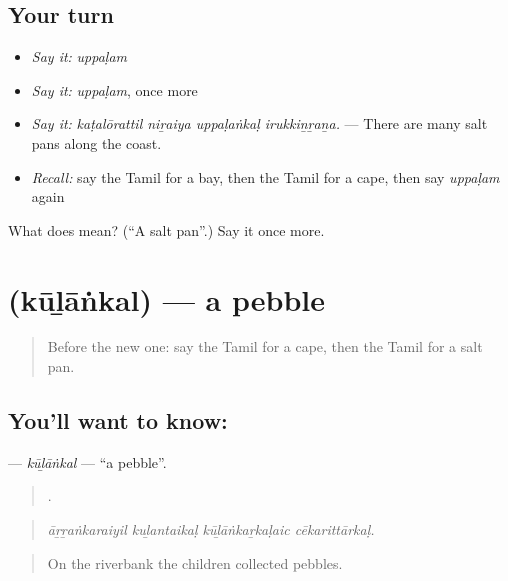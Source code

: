 \subsection*{Your turn}
\begin{itemize}
\raggedright
  \item \emph{Say it:} \emph{uppaḷam}
  \item \emph{Say it:} \emph{uppaḷam}, once more
  \item \emph{Say it:} \emph{kaṭalōrattil niṟaiya uppaḷaṅkaḷ irukkiṉṟaṉa.} — There are many salt pans along the coast.
  \item \emph{Recall:} say the Tamil for a bay, then the Tamil for a cape, then say \emph{uppaḷam} again
\end{itemize}

\begin{tcolorbox}[breakable,colback=teal!4,colframe=teal!35!black,title={Before you move on}]
What does  mean? (\textquotedblleft{}A salt pan\textquotedblright{}.) Say it once more.
\end{tcolorbox}
\section[\texorpdfstring{\ta{கூழாங்கல்} (kūḻāṅkal)}{கூழாங்கல் (kūḻāṅkal)}]{ (kūḻāṅkal) — a pebble}

\label{lesson:TA-C435-kulankal}



\begin{quote}
Before the new one: say the Tamil for a cape, then the Tamil for a salt pan.
\end{quote}

\subsection*{You'll want to know: }
\textbf{} — \emph{kūḻāṅkal} — \textquotedblleft{}a pebble\textquotedblright{}.

\begin{quote}
   .
\end{quote}

\begin{quote}
\emph{āṟṟaṅkaraiyil kuḻantaikaḷ kūḻāṅkaṟkaḷaic cēkarittārkaḷ.}
\end{quote}

\begin{quote}
On the riverbank the children collected pebbles.
\end{quote}

